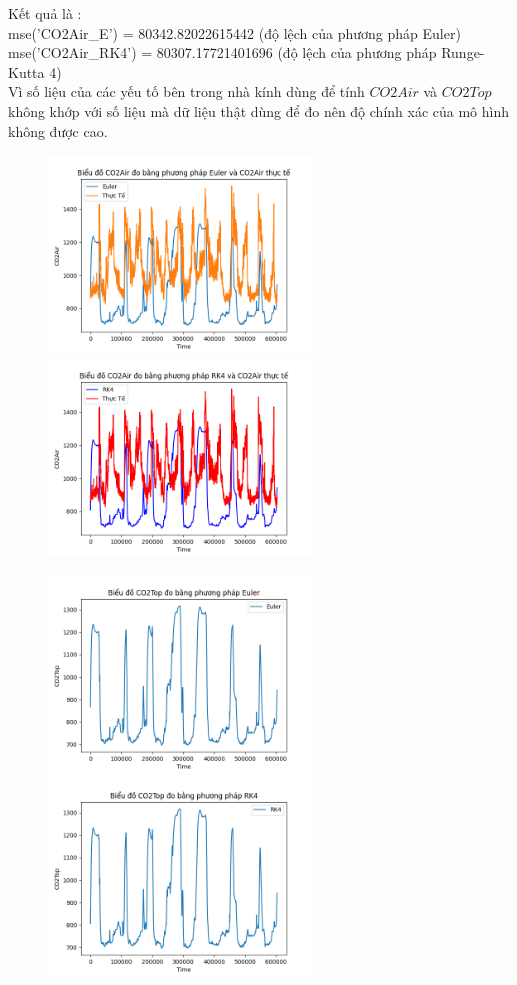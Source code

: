 \documentclass[a4paper]{article}
\begin{document}
Kết quả là :\\
mse('CO2Air\_E') = 80342.82022615442 (độ lệch của phương pháp Euler)\\
mse('CO2Air\_RK4') = 80307.17721401696 (độ lệch của phương pháp Runge-Kutta 4)\\

Vì số liệu của các yếu tố bên trong nhà kính dùng để tính $CO2Air$ và $CO2Top$ không khớp với số liệu mà dữ liệu thật dùng để đo nên độ chính xác của mô hình không được cao. 

\begin{figure}[h]
\begin{center}
\includegraphics[width=7cm]{4b_euler.png}
\includegraphics[width=7cm]{4b_rk4.png}
\end{center}
\end{figure}

\begin{figure}[h]
\begin{center}
\includegraphics[width=7cm]{4b_TOP_Euler.png}
\includegraphics[width=7cm]{4b_TOP_RK4.png}
\end{center}
\end{figure}
\end{document}
